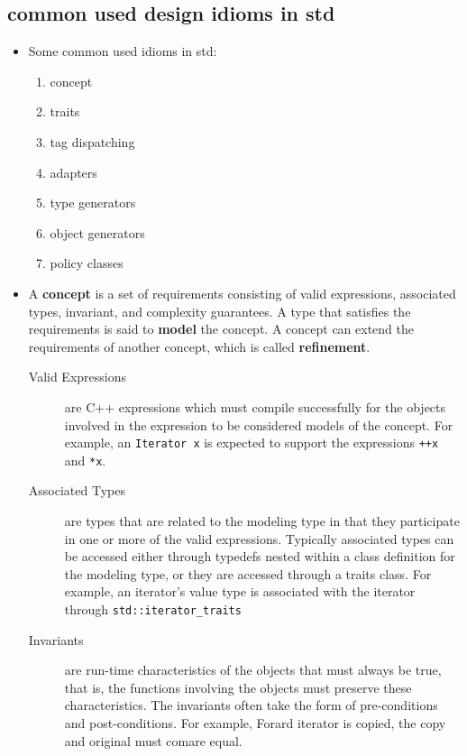\documentclass[a4paper,11pt,twoside]{book}
\begin{document}
\subsection{common used design idioms in std}
\begin{itemize}
	\item Some common used idioms in std:
	\begin{enumerate}
		\item concept
		\item traits
		\item tag dispatching
		\item adapters
		\item type generators
		\item object generators
		\item policy classes
	\end{enumerate}
	
\item A \textbf{concept} is a set of requirements consisting of valid expressions, associated types, invariant, and complexity guarantees. A type that satisfies the requirements is said to \textbf{model} the concept. A concept can extend the requirements of another concept, which is called \textbf{refinement}.

\begin{description}
	\item[Valid Expressions] are C++ expressions which must compile successfully for the objects involved in the expression to be considered models of the concept. For example, an \texttt{Iterator x} is expected to support the expressions \texttt{++x} and \texttt{*x}.
	
	\item[Associated Types] are types that are related to the modeling type in that they participate in one or more of the valid expressions. Typically associated types can be accessed either through typedefs nested within a class definition for the modeling type, or they are accessed through a traits class. For example, an iterator's value type is associated with the iterator through \texttt{std::iterator\_traits}
	
	\item[Invariants] are run-time characteristics of the objects that must always be true, that is, the functions involving the objects must preserve these characteristics. The invariants often take the form of pre-conditions and post-conditions. For example, Forard iterator is copied, the copy and original must comare equal.
	

\end{description}
\end{itemize}
\end{document}
